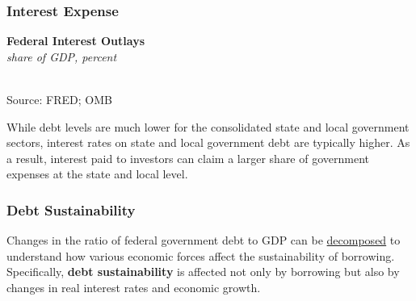 \documentclass{report}
\makeatletter
\newcommand{\tbllink}[1]{\href{https://raw.githubusercontent.com/bdecon/US-chartbook/master/chartbook/data/#1}{\faTable}}
\newcommand*\short[1]{\expandafter\@gobbletwo\number\numexpr#1\relax}
\newcommand{\shdateaxisticks}{
		date coordinates in=x, axis line style={draw=none},
		xmax={2022-03-15},
		max space between ticks=40,	    
		xtick={{1990-01-01}, {1995-01-01}, {2000-01-01}, 
			{2005-01-01}, {2010-01-01}, {2015-01-01}, {2020-01-01}},
		minor xtick={},
		enlarge y limits={0.06}, enlarge x limits={0.01},
		}
\newcommand{\thickline}[4]{\addplot[ultra thick, no markers, color=#1] 
		table [x=#2, y=#3, col sep=comma] {#4};	}
\newcommand{\rbars}{
		\fill[color=black!10] (axis cs:{1990-07-01},\pgfkeysvalueof{/pgfplots/ymin}) rectangle 
			(axis cs:{1991-03-01}, \pgfkeysvalueof{/pgfplots/ymax});
		\fill[color=black!10] (axis cs:{2007-12-01},\pgfkeysvalueof{/pgfplots/ymin}) rectangle 
			(axis cs:{2009-07-01}, \pgfkeysvalueof{/pgfplots/ymax});
		\fill[color=black!10] (axis cs:{2001-03-01},\pgfkeysvalueof{/pgfplots/ymin}) rectangle 
			(axis cs:{2001-11-01}, \pgfkeysvalueof{/pgfplots/ymax});
		\fill[color=black!10] (axis cs:{2020-02-01},\pgfkeysvalueof{/pgfplots/ymin}) rectangle 
			(axis cs:{2020-05-01}, \pgfkeysvalueof{/pgfplots/ymax});}
\makeatother
\begin{document}
{\subsubsection*{Interest Expense}
\begin{minipage}{0.33\textwidth}
\small 
\end{minipage} \hspace{6mm} \begin{minipage}{0.38\textwidth}
\normalsize \textbf{Federal Interest Outlays}\\
\footnotesize{\textit{share of GDP, percent}}\\
\hspace*{-2mm} \\
\footnotesize{Source: FRED; OMB} \hfill \tbllink{fedintexp.csv}
\end{minipage} 
\vspace{1mm}

\begin{minipage}{0.76\textwidth}
\small While debt levels are much lower for the consolidated state and local government sectors, interest rates on state and local government debt are typically higher. As a result, interest paid to investors can claim a larger share of government expenses at the state and local level.
\end{minipage}
\newpage
\begin{minipage}{0.76\textwidth}
\subsubsection*{Debt Sustainability}
\small Changes in the ratio of federal government debt to GDP can be \href{https://www.imf.org/en/Publications/TNM/Issues/2016/12/31/A-Practical-Guide-to-Public-Debt-Dynamics-Fiscal-Sustainability-and-Cyclical-Adjustment-of-23498}{decomposed} to understand how various economic forces affect the sustainability of borrowing. Specifically, \textbf{debt sustainability} is affected not only by borrowing but also by changes in real interest rates and economic growth. 


\end{minipage}}
\end{document}
